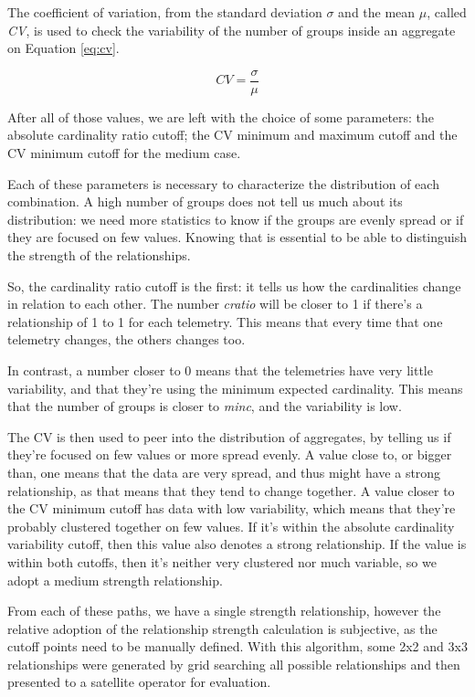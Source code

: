 The coefficient of variation, from the standard deviation \(\sigma\) and the mean \(\mu\), called \emph{CV}, is used to check the variability of the number of groups inside an aggregate on Equation \ref{eq:cv}.

\begin{equation} \label{eq:cv}
    CV = \frac{\sigma}{\mu}
\end{equation}

After all of those values, we are left with the choice of some parameters: the absolute cardinality ratio cutoff; the CV minimum and maximum cutoff and the CV minimum cutoff for the medium case.

Each of these parameters is necessary to characterize the distribution of each combination.
A high number of groups does not tell us much about its distribution: we need more statistics to know if the groups are evenly spread or if they are focused on few values.
Knowing that is essential to be able to distinguish the strength of the relationships.

So, the cardinality ratio cutoff is the first: it tells us how the cardinalities change in relation to each other.
The number \emph{cratio} will be closer to 1 if there's a relationship of 1 to 1 for each telemetry. This means that every time that one telemetry changes, the others changes too.

In contrast, a number closer to 0 means that the telemetries have very little variability, and that they're using the minimum expected cardinality.
This means that the number of groups is closer to \emph{minc}, and the variability is low.

The CV is then used to peer into the distribution of aggregates, by telling us if they're focused on few values or more spread evenly.
A value close to, or bigger than, one means that the data are very spread, and thus might have a strong relationship, as that means that they tend to change together.
A value closer to the CV minimum cutoff has data with low variability, which means that they're probably clustered together on few values.
If it's within the absolute cardinality variability cutoff, then this value also denotes a strong relationship.
If the value is within both cutoffs, then it's neither very clustered nor much variable, so we adopt a medium strength relationship.

From each of these paths, we have a single strength relationship, however the relative adoption of the relationship strength calculation is subjective, as the cutoff points need to be manually defined.
With this algorithm, some 2x2 and 3x3 relationships were generated by grid searching all possible relationships and then presented to a satellite operator for evaluation.

